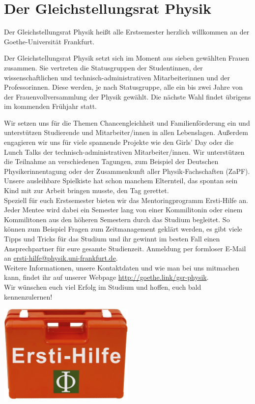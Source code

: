 \section{Der Gleichstellungsrat Physik}

Der Gleichstellungsrat Physik heißt alle Erstsemester herzlich willkommen an der Goethe-Universität Frankfurt.

Der Gleichstellungsrat Physik setzt sich im Moment aus sieben gewählten
Frauen zusammen. Sie vertreten die Statusgruppen der Studentinnen, der
wissenschaftlichen und technisch-administrativen Mitarbeiterinnen und
der Professorinnen. Diese werden, je nach Statusgruppe, alle ein bis zwei Jahre von der Frauenvollversammlung der Physik gewählt. Die nächste Wahl findet übrigens im kommenden Frühjahr statt. 

Wir setzen uns für die Themen Chancengleichheit und Familienförderung ein und unterstützen Studierende und Mitarbeiter/innen in allen Lebenslagen. Außerdem engagieren wir uns für viele spannende Projekte wie den Girls' Day oder die Lunch Talks der technisch-administrativen Mitarbeiter/innen. Wir unterstützen die Teilnahme an verschiedenen Tagungen, zum Beispiel der Deutschen Physikerinnentagung oder der Zusammenkunft aller Physik-Fachschaften (ZaPF). Unsere ausleihbare Spielkiste hat schon manchem Elternteil, das spontan sein Kind mit zur Arbeit bringen musste, den Tag gerettet.\\

Speziell für euch Erstsemester bieten wir das Mentoringprogramm Ersti-Hilfe an. Jeder Mentee wird dabei ein Semester lang von einer Kommilitonin oder einem Kommilitonen aus den höheren Semestern durch das Studium begleitet. So können zum Beispiel Fragen zum Zeitmanagement geklärt werden, es gibt viele Tipps und Tricks für das Studium und ihr gewinnt im besten Fall einen Ansprechpartner für eure gesamte Studienzeit. Anmeldung per formloser E-Mail an \url{ersti-hilfe@physik.uni-frankfurt.de}.\\

Weitere Informationen, unsere Kontaktdaten und wie man bei uns mitmachen kann, findet ihr auf unserer Webpage \url{http://goethe.link/gsr-physik}.\\


Wir wünschen euch viel Erfolg im Studium und hoffen, euch bald kennenzulernen!\\


\includegraphics[width=0.5\textwidth]{bilder/ersti-hilfe.png}
